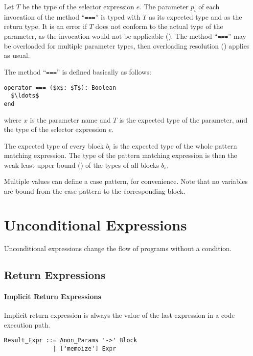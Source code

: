 Let $T$ be the type of the selector expression $e$. The parameter $p_i$ of each invocation of the method ``\lstinline!===!'' is typed with $T$ as its expected type and  as the return type. It is an error if $T$ does not conform to the actual type of the parameter, as the invocation would not be applicable (). The method ``\lstinline!===!'' may be overloaded for multiple parameter types, then overloading resolution () applies as usual. 

The method ``\lstinline!===!'' is defined basically as follows:
\begin{lstlisting}
operator === ($x$: $T$): Boolean
  $\ldots$
end
\end{lstlisting}
where $x$ is the parameter name and $T$ is the expected type of the parameter, and the type of the selector expression $e$. 

The expected type of every block $b_i$ is the expected type of the whole pattern matching expression. The type of the pattern matching expression is then the weak least upper bound () of the types of all blocks $b_i$.

Multiple values can define a case pattern, for convenience. Note that no variables are bound from the case pattern to the corresponding block.





\section{Unconditional Expressions}

Unconditional expressions change the flow of programs without a condition. 

\subsection{Return Expressions}
\label{sec:return-expressions}

\paragraph{Implicit Return Expressions}
Implicit return expression is always the value of the last expression in a code execution path. 

\syntax\begin{lstlisting}
Result_Expr ::= Anon_Params '->' Block 
              | ['memoize'] Expr
\end{lstlisting}


